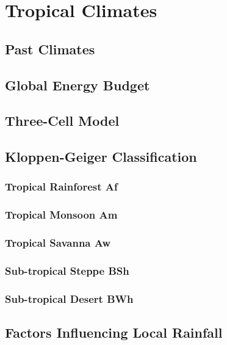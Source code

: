 \documentclass[../main]{subfiles}
\begin{document}
\section{Tropical Climates}

	\subsection{Past Climates}

	\subsection{Global Energy Budget}

	\subsection{Three-Cell Model}

	\subsection{Kloppen-Geiger Classification}

	\subsubsection{Tropical Rainforest Af}

	\subsubsection{Tropical Monsoon Am}

	\subsubsection{Tropical Savanna Aw}

	\subsubsection{Sub-tropical Steppe BSh}

	\subsubsection{Sub-tropical Desert BWh}

	\subsection{Factors Influencing Local Rainfall}
\end{document}
